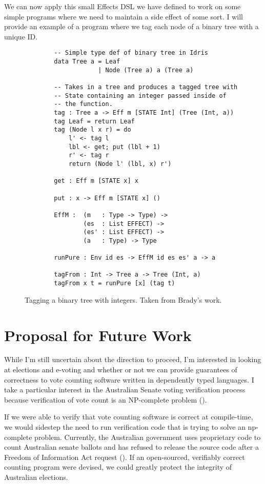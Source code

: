 We can now apply this small Effects DSL we have defined to work on some simple
programs where we need to maintain a side effect of some sort. I will provide an
example of a program where we tag each node of a binary tree with a unique ID. 

\begin{figure}[h]
    \caption{Tagging a binary tree with integers. Taken from Brady's work.
    \cite{algebraic}}
    \label{tag_def}
    \begin{lstlisting}
        -- Simple type def of binary tree in Idris
        data Tree a = Leaf
                    | Node (Tree a) a (Tree a)
        
        -- Takes in a tree and produces a tagged tree with
        -- State containing an integer passed inside of
        -- the function. 
        tag : Tree a -> Eff m [STATE Int] (Tree (Int, a))
        tag Leaf = return Leaf
        tag (Node l x r) = do
            l' <- tag l
            lbl <- get; put (lbl + 1)
            r' <- tag r
            return (Node l' (lbl, x) r')
        
        get : Eff m [STATE x] x
        
        put : x -> Eff m [STATE x] ()
        
        EffM :  (m   : Type -> Type) ->
                (es  : List EFFECT) ->
                (es' : List EFFECT) ->
                (a   : Type) -> Type
        
        runPure : Env id es -> EffM id es es' a -> a
        
        tagFrom : Int -> Tree a -> Tree (Int, a)
        tagFrom x t = runPure [x] (tag t)
    \end{lstlisting}
\end{figure}

\section{Proposal for Future Work}

While I'm still uncertain about the direction to proceed, I'm interested in
looking at elections and e-voting and whether or not we can provide guarantees
of correctness to vote counting software written in dependently typed languages.
I take a particular interest in the Australian Senate voting verification
process because verification of vote count is an NP-complete problem
(\cite{aus_senate}). 

If we were able to verify that vote counting software is correct at
compile-time, we would sidestep the need to run verification code that is trying
to solve an np-complete problem. Currently, the Australian government uses
proprietary code to count Australian senate ballots and has refused to release
the source code after a Freedom of Information Act request
(\cite{aus_senate_news}). If an open-sourced, verifiably correct counting
program were devised, we could greatly protect the integrity of Australian
elections. 

